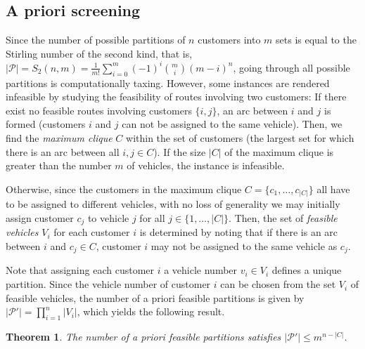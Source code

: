 \documentclass[dissertation,draft*]{aaltoseries}
\newtheorem{theorem}{Theorem}
\begin{document}
\subsection{A priori screening}
\label{earlydetection}
Since the  
number of possible partitions of $n$ customers into $m$ sets is equal to the Stirling number of the second kind, that is,
$|\mathcal{P}| = S_2(n,m) = \frac {1}{m!} \sum_{i=0}^{m} (-1)^i {m \choose i} (m-i)^n$,
going through all possible partitions is computationally taxing. However, some instances 
are rendered infeasible by studying the feasibility of routes involving two customers: 
If there exist no feasible routes involving customers $\{i,j\}$, an arc between $i$ and $j$ is formed 
(customers $i$ and $j$ can not be assigned to the same vehicle). Then, we find the \emph{maximum clique} $C$
within the set of customers (the largest set for which there is
an arc between all $i,j \in C$). If the size $|C|$ of the maximum clique
is greater than the number $m$ of vehicles, the instance is infeasible.

Otherwise, since the customers in the maximum clique $C = \{c_1,\ldots,c_{|C|}\}$ all have to be assigned to different vehicles, 
with no loss of generality we may initially assign customer $c_j$ to vehicle $j$ for all $j \in \{1,\ldots,|C|\}$.
Then, the set of \emph{feasible vehicles} $V_i$ for each customer $i$ is determined by noting that if there is an 
arc between $i$ and $c_j \in C$, customer $i$ may not be assigned to the same vehicle as $c_j$.

Note that assigning each customer $i$ a vehicle number $v_i \in V_i$ defines a unique partition.
Since the vehicle number of customer $i$ can be chosen from the set $V_i$ of feasible vehicles, 
the number of a priori feasible partitions is given by $|\mathcal{P}'| = \prod_{i=1}^n |V_i|$, which yields the following result.

\begin{theorem}
\label{partitions}
The number of a priori feasible partitions satisfies $|\mathcal{P}'| \leq m^{n-|C|}$.
\end{theorem}
\end{document}
